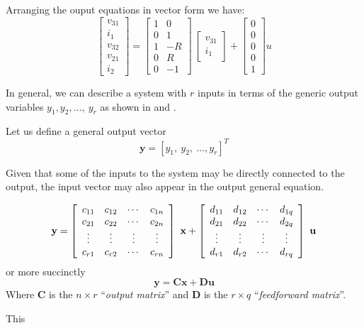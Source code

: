 \begin{slide}
Arranging the ouput equations in vector form we have:
\begin{displaymath}
\left[\begin{array}{c}
  v_{31} \\
  i_1 \\
  v_{32} \\
  v_{21} \\
  i_2
\end{array}\right] = \left[\begin{array}{cc}
  1 & 0 \\
  0 & 1 \\
  1 & -R \\
  0 & R \\
  0 & -1
\end{array}\right]\ \left[\begin{array}{c}
  v_{31} \\
  i_1
\end{array}\right]+\left[\begin{array}{c}
  0 \\
  0 \\
  0 \\
  0 \\
  1
\end{array}\right] u
\end{displaymath}
\end{slide}
\fi
In general, we can describe a system with $r$ inputs in terms of
the generic output variables $y_1, y_2,\ldots,\ y_r$ as shown in
 and .
\begin{slide}\label{slide:l1s5}
 Let us define a general
output vector
\[\mathbf{y} = \left[y_1,\ y_2,\ \ldots, y_r\right]^T\]

Given that some of the inputs to the system may be directly
connected to the output, the input vector may also appear in the
output general equation.
\end{slide}
\begin{slide}\label{slide:l1s6}
\[
\mathbf{y}=\left[\begin{array}{cccc}
  c_{11} & c_{12} & \cdots & c_{1n} \\
  c_{21} & c_{22} & \cdots & c_{2n} \\
  \vdots & \vdots & \vdots & \vdots \\
  c_{r1} & c_{r2} & \cdots & c_{rn}
\end{array}\right]\ \mathbf{x} + \left[\begin{array}{cccc}
  d_{11} & d_{12} & \cdots & d_{1q} \\
  d_{21} & d_{22} & \cdots & d_{2q} \\
  \vdots & \vdots & \vdots & \vdots \\
  d_{r1} & d_{r2} & \cdots & d_{rq}
\end{array}\right]\ \mathbf{u} \\
\]
or more succinctly
\[
\mathbf{y}=\mathbf{C}\mathbf{x}+\mathbf{D}\mathbf{u}
\]
Where $\mathbf{C}$ is the $n\times r$ ``\emph{output matrix}'' and
$\mathbf{D}$ is the $r\times q$ ``\emph{feedforward matrix}''.
\end{slide} This
